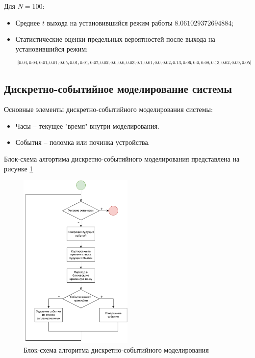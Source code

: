 Для $N=100$:
\begin{itemize}
    \item Среднее $t$ выхода на установившийся режим работы $8.061029372694884$;

    \item Статистические оценки предельных вероятностей после выхода на установившийся режим:
    \[
    \resizebox{\textwidth}{!}{$
[0.04, 0.04, 0.01, 0.01, 0.05, 0.01, 0.01, 0.07, 0.02, 0.0, 0.0, 0.03, 0.1, 0.01, 0.0, 0.02, 0.13, 0.06, 0.0, 0.08, 0.13, 0.02, 0.09, 0.05]
     $}
\]

\end{itemize}

\subsection{Дискретно-событийное моделирование системы}

Основные элементы дискретно-событийного моделирования системы:
\begin{itemize}
    \item Часы -- текущее "время" внутри моделирования.
    \item События -- поломка или починка устройства.
\end{itemize}
Блок-схема алгортима дискретно-событийного моделирования представлена на рисунке \ref{BS}

\begin{figure}[H]
\centerline{\includegraphics[width=0.5\textwidth]{Images/BS.pdf}}
\caption{Блок-схема алгоритма дискретно-событийного моделирования}
\label{BS}
\end{figure}

